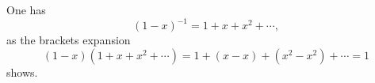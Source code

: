 \begin{exl}
One has
\[
(1-x)^{-1} = 1 + x + x^2 + \cdots,
\]
as the brackets expansion
\[
(1-x)(1+x+x^2+\cdots) = 1 + (x - x) + (x^2 - x^2) + \cdots = 1
\]
shows.
\end{exl}